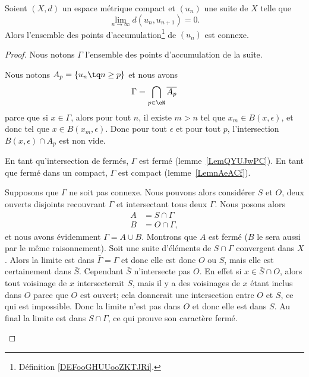 \begin{proposition} \label{PropLHWACDU}
	Soient \( (X,d)\) un espace métrique compact et \( (u_n)\) une suite de \( X\) telle que
	\begin{equation}
		\lim_{n\to \infty} d(u_n,u_{n+1})=0.
	\end{equation}
	Alors l'ensemble des points d'accumulation\footnote{Définition \ref{DEFooGHUUooZKTJRi}.} de \( (u_n)\) est connexe.
\end{proposition}

\begin{proof}
	Nous notons \( \Gamma\) l'ensemble des points d'accumulation de la suite.
	\begin{subproof}
		Nous notons \( A_p=\{ u_n\tq n\geq p \}\) et nous avons
		\begin{equation}
			\Gamma=\bigcap_{p\in \eN}\overline{ A_p }
		\end{equation}
		parce que si \( x\in\Gamma\), alors pour tout \( n\), il existe \( m>n\) tel que \( x_m\in B(x,\epsilon)\), et donc tel que \( x\in B(x_m,\epsilon)\). Donc pour tout \( \epsilon\) et pour tout \( p\), l'intersection \( B(x,\epsilon)\cap A_p\) est non vide.

		En tant qu'intersection de fermés, \( \Gamma\) est fermé (lemme~\ref{LemQYUJwPC}). En tant que fermé dans un compact, \( \Gamma\) est compact (lemme~\ref{LemnAeACf}).


		Supposons que \( \Gamma\) ne soit pas connexe. Nous pouvons alors considérer \( S\) et \( O\), deux ouverts disjoints recouvrant \( \Gamma\) et intersectant tous deux \( \Gamma\). Nous posons alors
		\begin{subequations}
			\begin{align}
				A & =S\cap\Gamma  \\
				B & =O\cap\Gamma,
			\end{align}
		\end{subequations}
		et nous avons évidemment \( \Gamma=A\cup B\). Montrons que \( A\) est fermé (\( B\) le sera aussi par le même raisonnement). Soit une suite d'éléments de \( S\cap \Gamma\) convergent dans \( X\). Alors la limite est dans \( \bar\Gamma=\Gamma\) et donc elle est donc \( O\) ou \( S\), mais elle est certainement dans \( \bar S\). Cependant \( \bar S\) n'intersecte pas \( O\). En effet si \( x\in \bar S\cap O\), alors tout voisinage de \( x\) intersecterait \( S\), mais il y a des voisinages de \( x\) étant inclus dans \( O\) parce que \( O\) est ouvert; cela donnerait une intersection entre \( O\) et \( S\), ce qui est impossible. Donc la limite n'est pas dans \( O\) et donc elle est dans \( S\). Au final la limite est dans \( S\cap \Gamma\), ce qui prouve son caractère fermé.


\end{subproof}
\end{proof}
